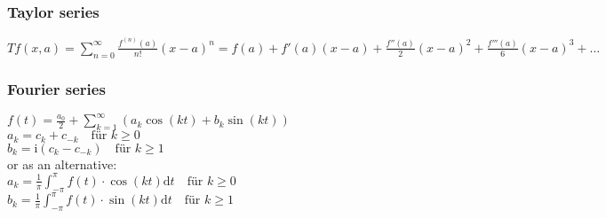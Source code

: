 \subsubsection{Taylor series}
$T f(x, a)  = \sum_{n=0}^\infty  \frac{f^{(n)}(a)}{n!} (x-a)^n = f(a) + f'(a) (x-a) + \frac{f''(a)}{2}(x-a)^2 + \frac{f'''(a)}{6} (x-a)^3 + \ldots$
\subsubsection{Fourier series}
$f(t)=\frac{a_{0}}{2}+\sum_{k=1}^{\infty}\left(a_{k}\cos\left(kt\right)+b_{k}\sin\left(kt\right)\right)$\\
$a_{k}=c_{k}+c_{-k}\quad\text{für }k\geq0$\\
$b_{k}=\mathrm{i}\left(c_{k}-c_{-k}\right)\quad\text{für }k\geq1$\\
or as an alternative:\\
$a_{k} = \frac{1}{\pi}\int_{-\pi}^{\pi}f(t)\cdot\cos\left(kt\right)\mathrm dt\quad\text{für }k\geq0$\\
$b_{k} = \frac{1}{\pi}\int_{-\pi}^{\pi}f(t)\cdot\sin\left(kt\right)\mathrm dt\quad\text{für }k\geq1$
